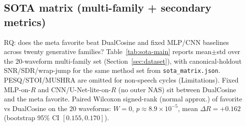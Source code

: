 \begin{table}[t]
  \centering
  \caption{Method scores on the canonical sine{+}cliff holdout (batch 64, seed \texttt{20260719}, $L{=}256$, $N{=}16$). Mean$\pm$std over five consecutive seeds. Identity is a no-op ceiling. Primary metric is prolonged $R$ (1~=~best).}
  \label{tab:canonical-methods}
  \setlength{\tabcolsep}{3pt}
\end{table}

\subsection{SOTA matrix (multi-family + secondary metrics)}
\label{sec:sota-main}

RQ: does the meta favorite beat DualCosine and fixed MLP/CNN baselines across twenty generative families?
Table~\ref{tab:sota-main} reports mean$\pm$std over the 20-waveform multi-family set (Section~\ref{sec:dataset}), with canonical-holdout SNR/SDR/wrap-jump for the same method set from \texttt{sota\_matrix.json}.
PESQ/STOI/MUSHRA are omitted for non-speech cycles (Limitations).
Fixed MLP-on-$R$ and CNN/U-Net-lite-on-$R$ (no outer NAS) sit between DualCosine and the meta favorite.
Paired Wilcoxon signed-rank (normal approx.) of favorite vs DualCosine on the 20 waveforms: $W{=}0$, $p{\approx}8.9{\times}10^{-5}$, mean $\Delta R{=}{+}0.162$ (bootstrap 95\% CI $[0.155,0.170]$).

